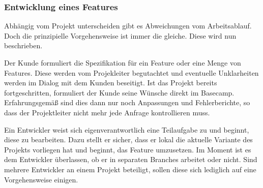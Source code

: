 % 


\subsubsection{Entwicklung eines Features} %
\label{ssub:entwicklung_eines_features}

Abhängig vom Projekt unterscheiden gibt es Abweichungen vom Arbeitsablauf. Doch die prinzipielle Vorgehensweise ist immer die gleiche. Diese wird nun beschrieben.

Der Kunde formuliert die Spezifikation für ein Feature oder eine Menge von Features. Diese werden vom Projekleiter begutachtet und eventuelle Unklarheiten werden im Dialog mit dem Kunden beseitigt. Ist das Projekt bereits fortgeschritten, formuliert der Kunde seine Wünsche direkt im Basecamp. Erfahrungsgemäß sind dies dann nur noch Anpassungen und Fehlerberichte, so dass der Projektleiter nicht mehr jede Anfrage kontrollieren muss.

Ein Entwickler weist sich eigenverantwortlich eine Teilaufgabe zu und beginnt, diese zu bearbeiten. Dazu stellt er sicher, dass er lokal die aktuelle Variante des Projekts vorliegen hat und beginnt, das Feature umzusetzen. Im Moment ist es dem Entwickler überlassen, ob er in separaten Branches arbeitet oder nicht. Sind mehrere Entwickler an einem Projekt beteiligt, sollen diese sich lediglich auf eine Vorgehensweise einigen.

